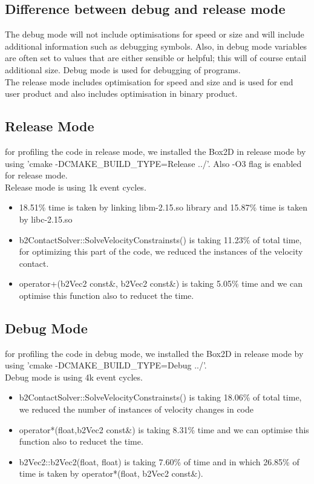 \documentclass[11pt]{article}
\begin{document}
\subsection{Difference between debug and release mode}
The debug mode will not include optimisations for speed or size and will include additional information such as debugging symbols. Also, in debug mode variables are often set to values that are either sensible or helpful; this will of course entail additional size. Debug mode is used for debugging of programs.\\
The release mode includes optimisation for speed and size and is used for end user product and also includes optimisation in binary product.
\subsection{Release Mode}
for profiling the code in release mode, we installed the Box2D in release mode by using 'cmake -DCMAKE\_BUILD\_TYPE=Release ../'. Also -O3 flag is enabled for release mode.\\
Release mode is using 1k event cycles.\\
\begin{itemize}
\item 18.51\% time is taken by linking libm-2.15.so library and 15.87\% time is taken by libc-2.15.so 
\item b2ContactSolver::SolveVelocityConstrainsts() is taking 11.23\% of total time, for optimizing this part of the code, we reduced the instances of the velocity contact.
\item operator+(b2Vec2 const\&, b2Vec2 const\&) is taking 5.05\% time and we can optimise this function also to reducet the time.
\end{itemize}
\subsection{Debug Mode}
for profiling the code in debug mode, we installed the Box2D in release mode by using 'cmake -DCMAKE\_BUILD\_TYPE=Debug ../'. \\
Debug mode is using 4k event cycles.\\
\begin{itemize}
\item b2ContactSolver::SolveVelocityConstrainsts() is taking 18.06\% of total time, we reduced the number of instances of velocity changes in code
\item operator*(float,b2Vec2 const\&) is taking 8.31\% time and we can optimise this function also to reducet the time.
\item b2Vec2::b2Vec2(float, float) is taking 7.60\% of time and in which 26.85\% of time is taken by operator*(float, b2Vec2 const\&).
\end{itemize}
\end{document}
